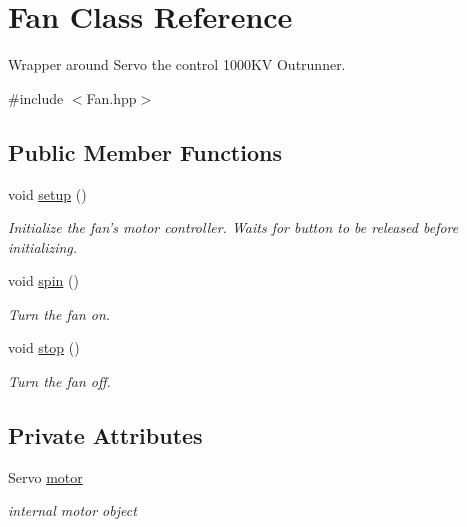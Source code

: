 \hypertarget{classFan}{\section{Fan Class Reference}
\label{classFan}
}


Wrapper around Servo the control 1000\-K\-V Outrunner.  




{\ttfamily \#include $<$Fan.\-hpp$>$}

\subsection*{Public Member Functions}
\begin{DoxyCompactItemize}
\item 
void \hyperlink{classFan_afa6c28ec10c0f00270e04abc8344e220}{setup} ()
\begin{DoxyCompactList}\small\item\em Initialize the fan's motor controller. Waits for button to be released before initializing. \end{DoxyCompactList}\item 
void \hyperlink{classFan_ab0574452a1e4ad34f668b4792be6021c}{spin} ()
\begin{DoxyCompactList}\small\item\em Turn the fan on. \end{DoxyCompactList}\item 
void \hyperlink{classFan_af4a96b6fd535b30f933a8bf8d1af50ff}{stop} ()
\begin{DoxyCompactList}\small\item\em Turn the fan off. \end{DoxyCompactList}\end{DoxyCompactItemize}
\subsection*{Private Attributes}
\begin{DoxyCompactItemize}
\item 
Servo \hyperlink{classFan_aff9de16d110a96ff5788f7d6ad6ef715}{motor}
\begin{DoxyCompactList}\small\item\em internal motor object \end{DoxyCompactList}\end{DoxyCompactItemize}
